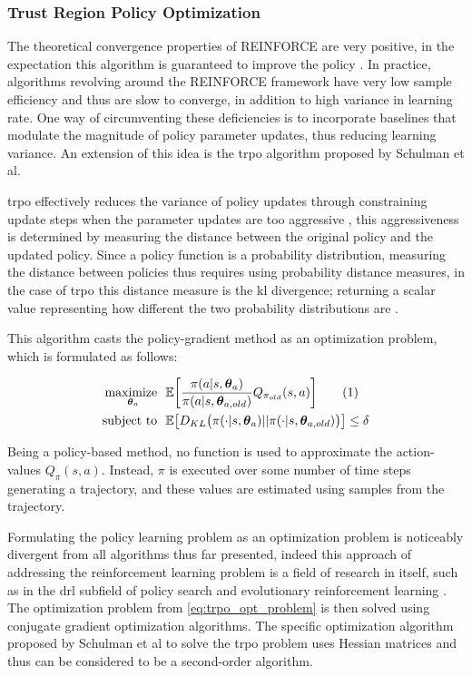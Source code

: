 \documentclass[../report.tex]{subfiles}
\begin{document}
\subsubsection{Trust Region Policy Optimization}

The theoretical convergence properties of REINFORCE are very positive, in the expectation this algorithm is guaranteed to improve the policy \cite{williams1992simple, intro_rl}. In practice, algorithms revolving around the REINFORCE framework have very low sample efficiency and thus are slow to converge, in addition to high variance in learning rate. One way of circumventing these deficiencies is to incorporate baselines that modulate the magnitude of policy parameter updates, thus reducing learning variance. An extension of this idea is the \ac{trpo} algorithm proposed by Schulman et al.

\ac{trpo} effectively reduces the variance of policy updates through constraining update steps when the parameter updates are too aggressive \cite{trpo}, this aggressiveness is determined by measuring the distance between the original policy and the updated policy. Since a policy function is a probability distribution, measuring the distance between policies thus requires using probability distance measures, in the case of \ac{trpo} this distance measure is the \ac{kl} divergence; returning a scalar value representing how different the two probability distributions are \cite{kullback1951information}. 

This algorithm casts the policy-gradient method as an optimization problem, which is formulated as follows:

{\myfont
\begin{align*}
    \underset{\boldsymbol{\theta}_a}{\text{maximize }} \ &\mathbb{E} \bigg[\frac{\pi(a|s,\boldsymbol{\theta}_a)}{\pi(a|s, \boldsymbol{\theta}_{a,old})} Q_{\pi_{old}}(s,a)\bigg] \stepcounter{equation}\tag{\theequation}\label{eq:trpo_opt_problem}\\
    \text{subject to }\  &\mathbb{E} \big[ D_{KL}\big(\pi(\cdot|s, \boldsymbol{\theta}_a) || \pi(\cdot |s, \boldsymbol{\theta}_{a, old})\big)\big] \leq \delta
\end{align*}
}

Being a policy-based method, no function is used to approximate the action-values $Q_{\pi}(s,a)$. Instead, $\pi$ is executed over some number of time steps generating a trajectory, and these values are estimated using samples from the trajectory.

Formulating the policy learning problem as an optimization problem is noticeably divergent from all algorithms thus far presented, indeed this approach of addressing the reinforcement learning problem is a field of research in itself, such as in the \ac{drl} subfield of policy search \cite{deisenroth2013survey} and evolutionary reinforcement learning \cite{erl}. The optimization problem from \autoref{eq:trpo_opt_problem} is then solved using conjugate gradient optimization algorithms. The specific optimization algorithm proposed by Schulman et al to solve the \ac{trpo} problem uses Hessian matrices and thus can be considered to be a second-order algorithm.
\end{document}
